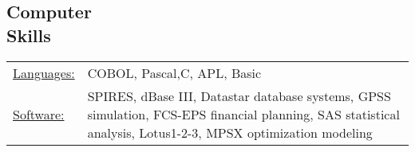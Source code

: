 \documentclass[margin]{res}
\begin{document}
\begin{resume}
\section{Computer \\ Skills}
   \begin{tabular}{l p{3in}}
    \underline{Languages:} & COBOL, Pascal,C, APL, Basic \\

     \underline{Software:} &  SPIRES, dBase III, Datastar database
                        systems, GPSS simulation, FCS-EPS financial
                        planning, SAS statistical analysis,
                        Lotus1-2-3, MPSX optimization modeling
 \end{tabular}

\end{resume}
\end{document}
